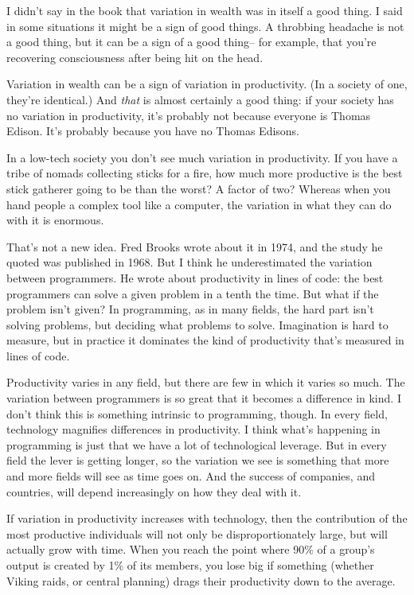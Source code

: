 \documentclass[12pt]{book}
\begin{document}
I didn't say in the book that variation in wealth was in itself a good
thing. I said in some situations it might be a sign of good things. A
throbbing headache is not a good thing, but it can be a sign of a good
thing-- for example, that you're recovering consciousness after being
hit on the head.

Variation in wealth can be a sign of variation in productivity. (In a
society of one, they're identical.) And \emph{that} is almost certainly
a good thing: if your society has no variation in productivity, it's
probably not because everyone is Thomas Edison. It's probably because
you have no Thomas Edisons.

In a low-tech society you don't see much variation in productivity. If
you have a tribe of nomads collecting sticks for a fire, how much more
productive is the best stick gatherer going to be than the worst? A
factor of two? Whereas when you hand people a complex tool like a
computer, the variation in what they can do with it is enormous.

That's not a new idea. Fred Brooks wrote about it in 1974, and the study
he quoted was published in 1968. But I think he underestimated the
variation between programmers. He wrote about productivity in lines of
code: the best programmers can solve a given problem in a tenth the
time. But what if the problem isn't given? In programming, as in many
fields, the hard part isn't solving problems, but deciding what problems
to solve. Imagination is hard to measure, but in practice it dominates
the kind of productivity that's measured in lines of code.

Productivity varies in any field, but there are few in which it varies
so much. The variation between programmers is so great that it becomes a
difference in kind. I don't think this is something intrinsic to
programming, though. In every field, technology magnifies differences in
productivity. I think what's happening in programming is just that we
have a lot of technological leverage. But in every field the lever is
getting longer, so the variation we see is something that more and more
fields will see as time goes on. And the success of companies, and
countries, will depend increasingly on how they deal with it.

If variation in productivity increases with technology, then the
contribution of the most productive individuals will not only be
disproportionately large, but will actually grow with time. When you
reach the point where 90\% of a group's output is created by 1\% of its
members, you lose big if something (whether Viking raids, or central
planning) drags their productivity down to the average.
\end{document}
